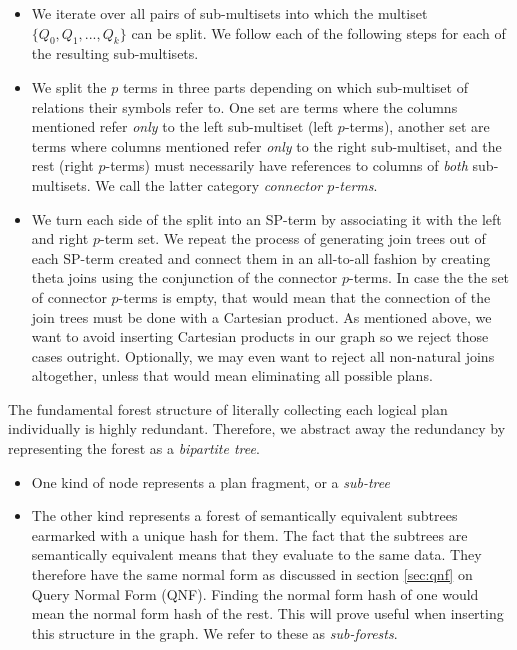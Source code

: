 \begin{itemize}
\item We iterate over all pairs of sub-multisets into which the
  multiset \(\{Q_0,Q_1,...,Q_k\}\) can be split. We follow each of the
  following steps for each of the resulting sub-multisets.
\item We split the \(p\) terms in three parts depending on which
  sub-multiset of relations their symbols refer to. One set are terms
  where the columns mentioned refer \emph{only} to the left
  sub-multiset (left \(p\)-terms), another set are terms where columns
  mentioned refer \emph{only} to the right sub-multiset, and the rest
  (right \(p\)-terms) must necessarily have references to columns of
  \emph{both} sub-multisets. We call the latter category
  \emph{connector \(p\)-terms}.
\item We turn each side of the split into an SP-term by associating it
  with the left and right \(p\)-term set. We repeat the process of
  generating join trees out of each SP-term created and connect them
  in an all-to-all fashion by creating theta joins using the
  conjunction of the connector \(p\)-terms. In case the the set of
  connector \(p\)-terms is empty, that would mean that the connection
  of the join trees must be done with a Cartesian product. As
  mentioned above, we want to avoid inserting Cartesian products in
  our graph so we reject those cases outright. Optionally, we may even
  want to reject all non-natural joins altogether, unless that would
  mean eliminating all possible plans.
\end{itemize}

The fundamental forest structure of literally collecting each logical
plan individually is highly redundant. Therefore, we abstract away the
redundancy by representing the forest as a \emph{bipartite tree}.

\begin{itemize}
\item One kind of node represents a plan fragment, or a \emph{sub-tree}
\item The other kind represents a forest of semantically equivalent
  subtrees earmarked with a unique hash for them. The fact that the
  subtrees are semantically equivalent means that they
  evaluate to the same data. They therefore have the same normal form
  as discussed in section \ref{sec:qnf} on  Query Normal Form (QNF). Finding the normal form
  hash of one would mean the normal form hash of the rest. This will
  prove useful when inserting this structure in the graph. We refer to
  these as \emph{sub-forests}.
\end{itemize}


